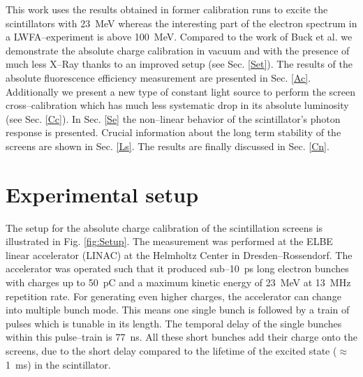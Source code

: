 \documentclass[%
reprint,
amsmath,
amssymb,
aip,
rsi, 
numerical,
floatfix,
]{revtex4-1}
\newcommand{\myCite}[1]{\textcolor{blue}{\cite{#1}}}
\begin{document}
This work uses the results obtained in former calibration runs\myCite{Glinec2006,Nakamura2011} to excite the scintillators with \SI{23}{\mega\electronvolt} whereas the interesting part of the electron spectrum in a LWFA--experiment is above \SI{100}{\mega\electronvolt}.
Compared to the work of Buck et al.\myCite{Buck2010} we demonstrate the absolute charge calibration in vacuum and with the presence of much less X--Ray thanks to an improved setup (see Sec. \ref{Set}).
The results of the absolute fluorescence efficiency measurement are presented in Sec. \ref{Ac}.
Additionally we present a new type of constant light source to perform the screen cross--calibration which has much less systematic drop in its absolute luminosity (see Sec. \ref{Cc}).
In Sec. \ref{Se} the non--linear behavior of the scintillator's photon response is presented.
Crucial information about the long term stability of the screens are shown in Sec. \ref{Ls}. 
The results are finally discussed in Sec. \ref{Cn}.

\section{\label{Set} Experimental setup}

The setup for the absolute charge calibration of the scintillation screens is illustrated in Fig. \ref{fig:Setup}.
The measurement was performed at the ELBE linear accelerator (LINAC) at the Helmholtz Center in Dresden--Rossendorf. 
The accelerator was operated such that it produced sub--\SI{10}{\pico\second} long electron bunches with charges up to \SI{50}{\pico\coulomb} and a maximum kinetic energy of \SI{23}{\mega\electronvolt} at \SI{13}{\mega\hertz} repetition rate.  
For generating even higher charges, the accelerator can change into multiple bunch mode. 
This means one single bunch is followed by a train of pulses which is tunable in its length.
The temporal delay of the single bunches within this pulse--train is \SI{77}{\nano\second}. 
All these short bunches add their charge onto the screens, due to the short delay compared to the lifetime of the excited state ($\approx$ \SI{1}{\milli\second}) in the scintillator\myCite{Morlotti1997}.
\end{document}
